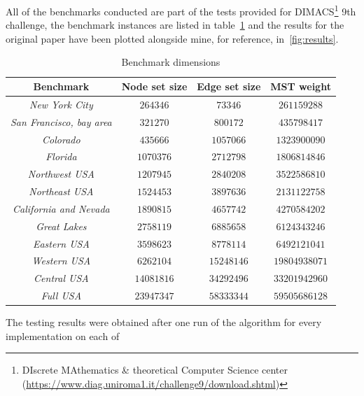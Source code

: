 \documentclass[a4paper,10pt]{article}
\begin{document}
All of the benchmarks conducted are part of the tests provided for DIMACS\footnote{DIscrete
	MAthematics \& theoretical Computer Science center
	(\url{https://www.diag.uniroma1.it/challenge9/download.shtml})} 9th challenge, the benchmark
instances are listed in table~\ref{tbl:benchmarks} and the results for the original paper have been
plotted alongside mine, for reference, in~\ref{fig:results}.
\begin{longtable}{|c|c|c|c|}
	\caption{Benchmark dimensions}\label{tbl:benchmarks}
	\\\hline\textbf{Benchmark} & \textbf{Node set size} & \textbf{Edge set size} & \textbf{MST weight} \\\hline\hline
	\endfirsthead\hline\endlastfoot

	\textit{New York City}           & $\num{264346}$   & $\num{73346}$    & $\num{261159288}$   \\\hline
	\textit{San Francisco, bay area} & $\num{321270}$   & $\num{800172}$   & $\num{435798417}$   \\\hline
	\textit{Colorado}                & $\num{435666}$   & $\num{1057066}$  & $\num{1323900090}$  \\\hline
	\textit{Florida}                 & $\num{1070376}$  & $\num{2712798}$  & $\num{1806814846}$  \\\hline
	\textit{Northwest USA}           & $\num{1207945}$  & $\num{2840208}$  & $\num{3522586810}$  \\\hline
	\textit{Northeast USA}           & $\num{1524453}$  & $\num{3897636}$  & $\num{2131122758}$  \\\hline
	\textit{California and Nevada}   & $\num{1890815}$  & $\num{4657742}$  & $\num{4270584202}$  \\\hline
	\textit{Great Lakes}             & $\num{2758119}$  & $\num{6885658}$  & $\num{6124343246}$  \\\hline
	\textit{Eastern USA}             & $\num{3598623}$  & $\num{8778114}$  & $\num{6492121041}$  \\\hline
	\textit{Western USA}             & $\num{6262104}$  & $\num{15248146}$ & $\num{19804938071}$ \\\hline
	\textit{Central USA}             & $\num{14081816}$ & $\num{34292496}$ & $\num{33201942960}$ \\\hline
	\textit{Full USA}                & $\num{23947347}$ & $\num{58333344}$ & $\num{59505686128}$ \\\hline
\end{longtable}
The testing results were obtained after one run of the algorithm for every implementation on each of
\end{document}
